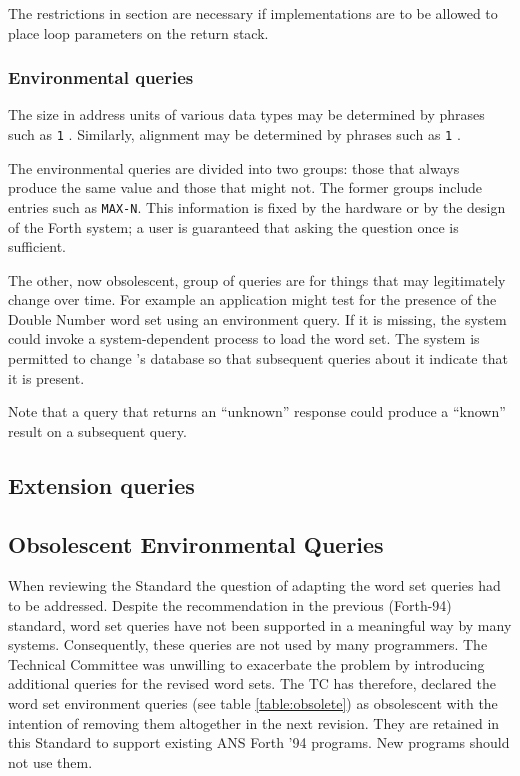 The restrictions in section 
are necessary if implementations are to be allowed to place loop
parameters on the return stack.

\addtocounter{subsubsection}{2}
\subsubsection{Environmental queries} %

The size in address units of various data types may be determined by
phrases such as \texttt{1} . Similarly, alignment may be
determined by phrases such as \texttt{1} .

The environmental queries are divided into two groups: those that
always produce the same value and those that might not. The former
groups include entries such as \texttt{MAX-N}. This information is
fixed by the hardware or by the design of the Forth system; a user
is guaranteed that asking the question once is sufficient.

The other, now obsolescent, group of queries are for things that may
legitimately change over time. For example an application might test
for the presence of the Double Number word set using an environment
query.  If it is missing, the system could invoke a system-dependent
process to load the word set. The system is permitted to change
's database so that subsequent queries about
it indicate that it is present.

Note that a query that returns an ``unknown'' response could produce
a ``known'' result on a subsequent query.

\subsection{Extension queries}

\subsection{Obsolescent Environmental Queries}
\label{rat:obsolet}

When reviewing the Standard the question of adapting the word set
queries had to be addressed.  Despite the recommendation in the
previous (Forth-94) standard, word set queries have not been
supported in a meaningful way by many systems.  Consequently, these
queries are not used by many programmers.  The Technical Committee
was unwilling to exacerbate the problem by introducing additional
queries for the revised word sets.  The TC has therefore, declared
the word set environment queries (see table \ref{table:obsolete}) as
obsolescent with the intention of removing them altogether in the
next revision.
They are retained in this Standard to support existing ANS Forth '94
programs.  New programs should not use them.

